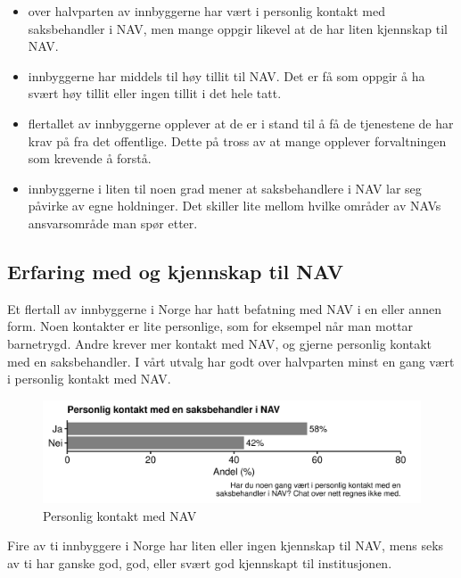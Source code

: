 \documentclass[
  12pt,
  a4paper, 12pt]{article}
\providecommand{\tightlist}{%
  \setlength{\itemsep}{0pt}\setlength{\parskip}{0pt}}
\begin{document}
\begin{itemize}
\tightlist
\item
  over halvparten av innbyggerne har vært i personlig kontakt med saksbehandler i NAV, men mange oppgir likevel at de har liten kjennskap til NAV.
\item
  innbyggerne har middels til høy tillit til NAV. Det er få som oppgir å ha svært høy tillit eller ingen tillit i det hele tatt.
\item
  flertallet av innbyggerne opplever at de er i stand til å få de tjenestene de har krav på fra det offentlige. Dette på tross av at mange opplever forvaltningen som krevende å forstå.
\item
  innbyggerne i liten til noen grad mener at saksbehandlere i NAV lar seg påvirke av egne holdninger. Det skiller lite mellom hvilke områder av NAVs ansvarsområde man spør etter.
\end{itemize}

\hypertarget{erfaring-med-og-kjennskap-til-nav}{%
\subsection{Erfaring med og kjennskap til NAV}\label{erfaring-med-og-kjennskap-til-nav}}

Et flertall av innbyggerne i Norge har hatt befatning med NAV i en eller annen form.
Noen kontakter er lite personlige, som for eksempel når man mottar barnetrygd.
Andre krever mer kontakt med NAV, og gjerne personlig kontakt med en saksbehandler.
I vårt utvalg har godt over halvparten minst en gang vært i personlig kontakt med NAV.

\begin{figure}

{\centering \includegraphics[width=0.8\linewidth]{figs/png/fig_nav_personal_contact} 

}

\caption{Personlig kontakt med NAV}\label{fig:unnamed-chunk-4}
\end{figure}

Fire av ti innbyggere i Norge har liten eller ingen kjennskap til NAV, mens seks av ti har ganske god, god, eller svært god kjennskapt til institusjonen.
\end{document}

